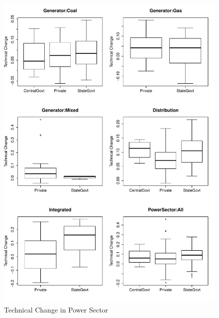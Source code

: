 \begin{figure}[h]
	\centering
	\caption{Technical Change in Power Sector}
	\label{fig:TechChange}
		\includegraphics[width=1.00\textwidth]{chapter02/TechChange.pdf}	
\end{figure}

